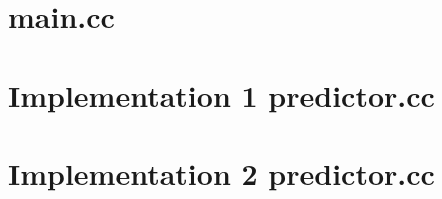 \documentclass[]{report}   %
\begin{document}
\section{main.cc}

\pagebreak

\section{Implementation 1 predictor.cc}

\pagebreak

\section{Implementation 2 predictor.cc}

\pagebreak



\end{document}
